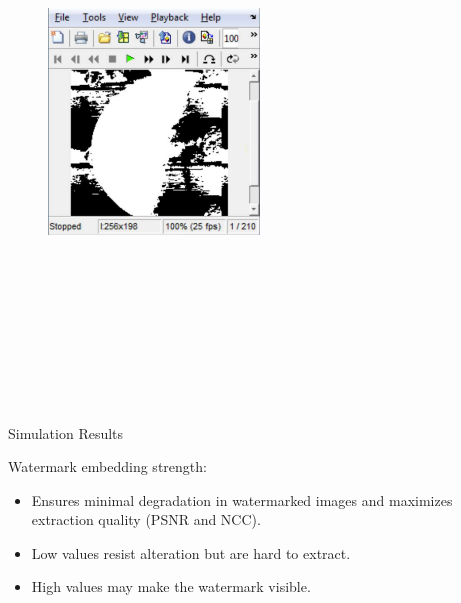 \documentclass[final]{beamer}
\newlength{\colwidth}
\begin{document}
\begin{frame}[t]
\begin{columns}[t]
\begin{column}{\colwidth}
\begin{multicols}{2}
\begin{figure}
\end{figure}
\lipsum
\columnbreak
\lipsum
\begin{figure}
    \centering
    \includegraphics[width=0.5\textwidth , height = 15cm]{images and logos/extracted image.pdf}
 
    \label{fig:img1}
\end{figure}
\lipsum

\end{multicols}


\vspace{\baselineskip} %




\begin{block}{Simulation Results}

     Watermark embedding strength:
    \begin{itemize}
        \item Ensures minimal degradation in watermarked images and maximizes extraction quality (PSNR and NCC).
        \item Low values resist alteration but are hard to extract.
        \item High values may make the watermark visible.
    \end{itemize}



\end{block}
\end{column}
\end{columns}
\end{frame}
\end{document}
